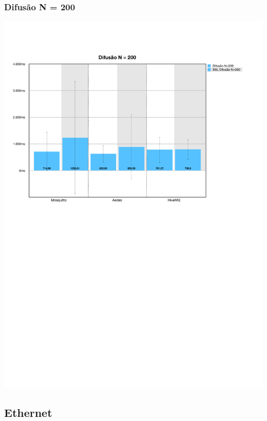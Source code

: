 \documentclass[12pt,a4paper]{article}
\begin{document}
\subsubsection{Difusão N = 200}
\begin{center}
\includegraphics[width=1.0\textwidth]{wifi_spread2.pdf}
\end{center}
\subsection{Ethernet}
\end{document}
